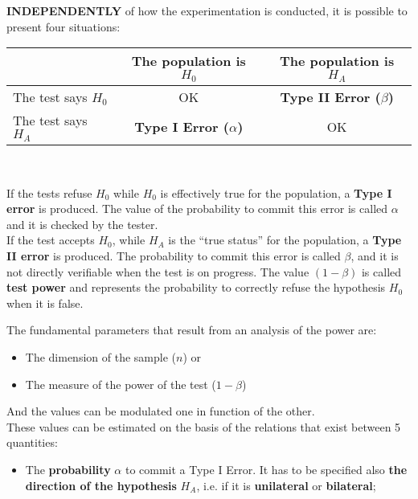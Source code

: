 \begin{frame}
  \begin{small}
    \textbf{INDEPENDENTLY} of how the experimentation is conducted, it is possible to present four situations:\\
    \vspace*{.25cm}
    \begin{center}
      \begin{tabular}{|l|c|c|}
        \cline{2-3}
        \multicolumn{1}{c|}{} & The population is $ H_0 $ & The population is $ H_A $ \\
        \hline
        The test says $H_0$ & OK & \textbf{Type II Error (}{\boldmath$\beta$}\textbf{)}\\
        \hline
        The test says $H_A$ & \textbf{Type I Error (}{\boldmath$\alpha$}\textbf{)} & OK \\
        \hline
      \end{tabular}\\
    \end{center}
    \vspace*{.5cm}
    If the tests refuse $H_0$ while $H_0$ is effectively true for the population, a \textbf{Type I error} is produced. The value of the probability to commit this error is called {\boldmath$\alpha$} and it is checked by the tester.\\
    \vspace*{.25cm}
    If the test accepts $H_0$, while $ H_A $ is the ``true status'' for the population, a \textbf{Type II error} is produced. The probability to commit this error is called {\boldmath$\beta$}, and it is not directly verifiable when the test is on progress. The value {\boldmath$(1-\beta)$} is called \textbf{test power} and represents the probability to correctly refuse the hypothesis $H_0$ when it is false.\\
  \end{small}
\end{frame}

\begin{frame}
  \vspace*{.25cm}
  The fundamental parameters that result from an analysis of the power are:
  \begin{itemize}
    \item The dimension of the sample ({\boldmath $ n $}) or
    \item The measure of the power of the test ({\boldmath$1-\beta$})
  \end{itemize}
  And the values can be modulated one in function of the other.\\
  \vspace*{.5cm}
  These values can be estimated on the basis of the relations that exist between 5 quantities:
  \vspace*{.5cm}
  \begin{itemize}
    \item The \textbf{probability} {\boldmath${\alpha}$} to commit a Type I Error. It has to be specified also \textbf{the direction of the hypothesis} $ H_A $, i.e. if it is \textbf{unilateral} or \textbf{bilateral};
  \end{itemize}
\end{frame}

